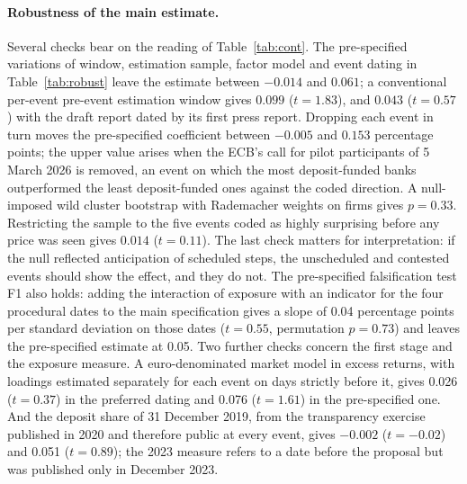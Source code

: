 \documentclass[11pt]{article}
\theoremstyle{plain}\newtheorem{proposition}{Proposition}
\begin{document}
\paragraph{Robustness of the main estimate.} Several checks bear on the reading of Table~\ref{tab:cont}. The pre-specified variations of window, estimation sample, factor model and event dating in Table~\ref{tab:robust} leave the estimate between $-0.014$ and $0.061$; a conventional per-event pre-event estimation window gives $0.099$ ($t=1.83$), and $0.043$ ($t = 0.57$) with the draft report dated by its first press report. Dropping each event in turn moves the pre-specified coefficient between $-0.005$ and $0.153$ percentage points; the upper value arises when the ECB's call for pilot participants of 5 March 2026 is removed, an event on which the most deposit-funded banks outperformed the least deposit-funded ones against the coded direction. A null-imposed wild cluster bootstrap with Rademacher weights on firms gives $p = 0.33$. Restricting the sample to the five events coded as highly surprising before any price was seen gives $0.014$ ($t = 0.11$). The last check matters for interpretation: if the null reflected anticipation of scheduled steps, the unscheduled and contested events should show the effect, and they do not. The pre-specified falsification test F1 also holds: adding the interaction of exposure with an indicator for the four procedural dates to the main specification gives a slope of 0.04 percentage points per standard deviation on those dates ($t = 0.55$, permutation $p = 0.73$) and leaves the pre-specified estimate at 0.05. Two further checks concern the first stage and the exposure measure. A euro-denominated market model in excess returns, with loadings estimated separately for each event on days strictly before it, gives 0.026 ($t = 0.37$) in the preferred dating and 0.076 ($t = 1.61$) in the pre-specified one. And the deposit share of 31 December 2019, from the transparency exercise published in 2020 and therefore public at every event, gives $-0.002$ ($t = -0.02$) and 0.051 ($t = 0.89$); the 2023 measure refers to a date before the proposal but was published only in December 2023.
\end{document}
